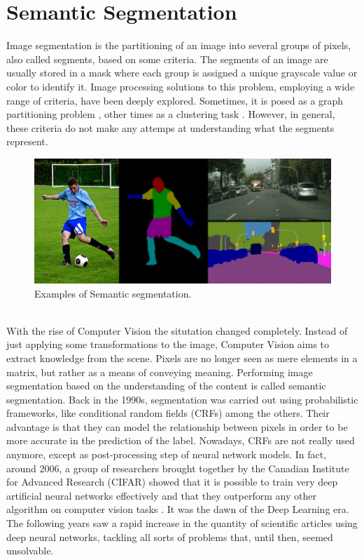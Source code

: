 \section{Semantic Segmentation}
Image segmentation is the partitioning of an image into several groups of pixels, also called segments, based on some criteria. The segments of an image are usually stored in a mask where each group is assigned a unique grayscale value or color to identify it. Image processing solutions to this problem, employing a wide range of criteria, have been deeply explored. Sometimes, it is posed as a graph partitioning problem \cite{shi2000normalized}, other times as a clustering task \cite{coleman1979image}. However, in general, these criteria do not make any attemps at understanding what the segments represent.\\
\begin{figure}[t]
    \centering
    \includegraphics[width=\textwidth]{./pictures/segmentation-masks}
    \caption{Examples of Semantic segmentation.}
    \label{fig:segmentation-masks}
\end{figure}\\
With the rise of Computer Vision the situtation changed completely. Instead of just applying some transformations to the image, Computer Vision aims to extract knowledge from the scene. Pixels are no longer seen as mere elements in a matrix, but rather as a means of conveying meaning. Performing image segmentation based on the understanding of the content is called semantic segmentation. Back in the 1990s, segmentation was carried out using probabilistic frameworks, like conditional random fields (CRFs) among the others. Their advantage is that they can model the relationship between pixels in order to be more accurate in the prediction of the label. Nowadays, CRFs are not really used anymore, except as post-processing step of neural network models. In fact, around 2006, a group of researchers brought together by the Canadian Institute for Advanced Research (CIFAR) showed that it is possible to train very deep artificial neural networks effectively \cite{hinton2006fast} and that they outperform any other algorithm on computer vision tasks \cite{hinton2006reducing}. It was the dawn of the Deep Learning era. The following years saw a rapid increase in the quantity of scientific articles using deep neural networks, tackling all sorts of problems that, until then, seemed unsolvable.
